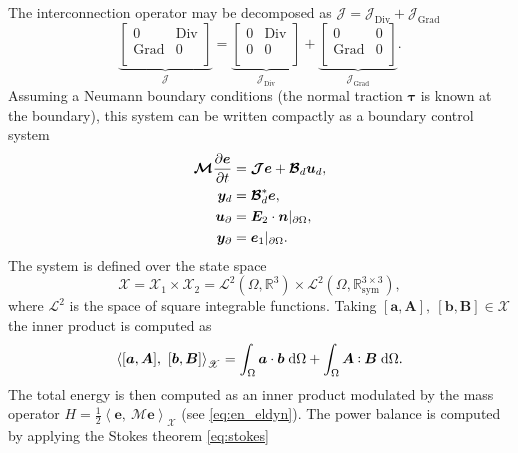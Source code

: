 \documentclass{svjour3}                     %
\DeclareMathOperator*{\Grad}{Grad}
\DeclareMathOperator*{\Div}{Div}
\def\onedot{$\mathsurround0pt\ldotp$}
\def\cddot{%
	\mathbin{\vcenter{\baselineskip.67ex
			\hbox{\onedot}\hbox{\onedot}}%
}}
\begin{document}
The interconnection operator may be decomposed as $\bm{\mathcal{J}} = \bm{\mathcal{J}}_{\Div} + \bm{\mathcal{J}}_{\Grad}$
\begin{equation}
\underbrace{\begin{bmatrix}
	0 & \Div \\ \Grad & 0 \\
	\end{bmatrix}}_{\bm{\mathcal{J}}} = 
\underbrace{\begin{bmatrix}
	0 & \Div \\ 0  & 0 \\
	\end{bmatrix}}_{\bm{\mathcal{J}}_{\Div}} + 
\underbrace{\begin{bmatrix}
	0 & 0 \\ \Grad & 0 \\
	\end{bmatrix}}_{\bm{\mathcal{J}}_{\Grad}}.
\end{equation}
Assuming a Neumann boundary conditions (the normal traction $\bm\tau$ is known at the boundary), this system can be written compactly as a boundary control system
\begin{equation}
\label{eq:eldyn_PDE}
\begin{aligned}
\bm{\mathcal{M}} \diffp{\bm{e}}{t} &= \bm{\mathcal{J}} \bm{e} + \bm{\mathcal{B}}_d \bm{u}_d, \\
\bm{y}_d &= \bm{\mathcal{B}}_d^* \bm{e}, \\
\bm{u}_\partial &= \bm{E}_2 \cdot \bm{n}|_{\partial\Omega}, \\
\bm{y}_\partial &= \bm{e}_1|_{\partial\Omega}.
\end{aligned}
\end{equation}
The system is defined over the state space
\[
\mathscr{X} = \mathscr{X}_1 \times \mathscr{X}_2 = \mathscr{L}^2(\Omega, \mathbb{R}^3) \times\mathscr{L}^2(\Omega, \mathbb{R}^{3\times 3}_{\text{sym}}),
\]
where $\mathscr{L}^2$ is the space of square integrable functions. Taking  $[\bm{a}, \bm{A}], \ [\bm{b}, \bm{B}] \in \mathscr{X}$ the inner product is computed as
\[
\left\langle [\bm{a}, \bm{A}], \ [\bm{b}, \bm{B}] \right\rangle_{\mathscr{X}} = \int_{\Omega} \bm{a} \cdot \bm{b} \d{\Omega} + \int_{\Omega} \bm{A} \cddot \bm{B} \d{\Omega}.
\]
The total energy is then computed as an inner product modulated by the mass operator $H = \frac{1}{2} \left\langle \bm{e}, \ \bm{\mathcal{M}} \bm{e} \right\rangle_{\mathscr{X}}$ (see \eqref{eq:en_eldyn}). The power balance is computed by applying the Stokes theorem \eqref{eq:stokes}
\end{document}
